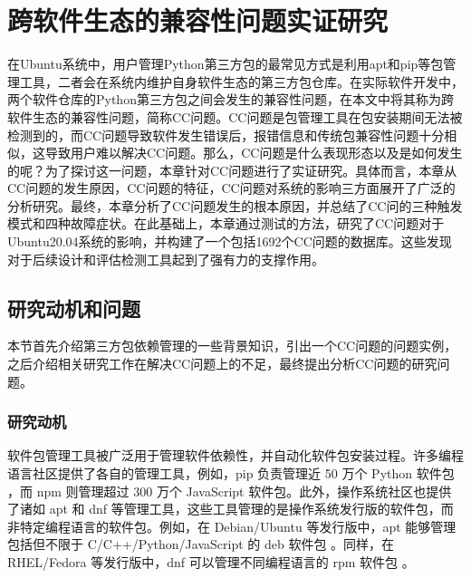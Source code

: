 \chapter{跨软件生态的兼容性问题实证研究}
在Ubuntu系统中，用户管理Python第三方包的最常见方式是利用apt和pip等包管理工具，二者会在系统内维护自身软件生态的第三方包仓库。在实际软件开发中，两个软件仓库的Python第三方包之间会发生的兼容性问题，在本文中将其称为跨软件生态的兼容性问题，简称CC问题。CC问题是包管理工具在包安装期间无法被检测到的，而CC问题导致软件发生错误后，报错信息和传统包兼容性问题十分相似，这导致用户难以解决CC问题。那么，CC问题是什么表现形态以及是如何发生的呢？为了探讨这一问题，本章针对CC问题进行了实证研究。具体而言，本章从CC问题的发生原因，CC问题的特征，CC问题对系统的影响三方面展开了广泛的分析研究。最终，本章分析了CC问题发生的根本原因，并总结了CC问的三种触发模式和四种故障症状。在此基础上，本章通过测试的方法，研究了CC问题对于Ubuntu20.04系统的影响，并构建了一个包括1692个CC问题的数据库。这些发现对于后续设计和评估检测工具起到了强有力的支撑作用。

\section{研究动机和问题}
本节首先介绍第三方包依赖管理的一些背景知识，引出一个CC问题的问题实例，之后介绍相关研究工作在解决CC问题上的不足，最终提出分析CC问题的研究问题。
\subsection{研究动机}
软件包管理工具被广泛用于管理软件依赖性，并自动化软件包安装过程。许多编程语言社区提供了各自的管理工具，例如，pip 负责管理近 50 万个 Python 软件包 ，而 npm 则管理超过 300 万个 JavaScript 软件包。此外，操作系统社区也提供了诸如 apt 和 dnf 等管理工具，这些工具管理的是操作系统发行版的软件包，而非特定编程语言的软件包。例如，在 Debian/Ubuntu 等发行版中，apt 能够管理包括但不限于 C/C++/Python/JavaScript 的 deb 软件包 。同样，在 RHEL/Fedora 等发行版中，dnf 可以管理不同编程语言的 rpm 软件包 。

